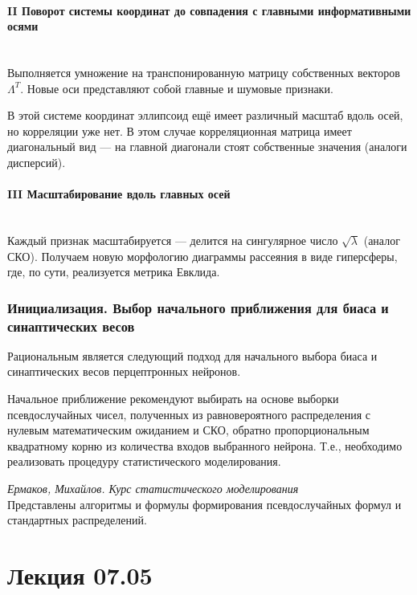 \documentclass{article}
\numberwithin{equation}{subsection}
\begin{document}
\paragraph{II Поворот системы координат до совпадения с 
главными информативными осями}\mbox{}\\
Выполняется умножение на транспонированную матрицу собственных векторов $\Lambda^T$.
Новые оси представляют собой главные и шумовые признаки.

В этой системе координат эллипсоид ещё имеет различный масштаб вдоль осей, но корреляции
уже нет.
В этом случае корреляционная матрица имеет диагональный вид --- на главной диагонали
стоят собственные значения (аналоги дисперсий).


\paragraph{III Масштабирование вдоль главных осей}\mbox{}\\
Каждый признак масштабируется --- делится на сингулярное число $\sqrt{\lambda}$
(аналог СКО).
Получаем новую морфологию диаграммы рассеяния в виде гиперсферы, где, по сути, реализуется
метрика Евклида.




\subsubsection{Инициализация. Выбор начального приближения для 
биаса и синаптических весов}

Рациональным является следующий подход для начального выбора биаса и синаптических
весов перцептронных нейронов.

Начальное приближение рекомендуют выбирать на основе выборки псевдослучайных чисел,
полученных из равновероятного распределения с нулевым математическим ожиданием 
и СКО, обратно пропорциональным квадратному корню из количества входов выбранного нейрона.
Т.е., необходимо реализовать процедуру статистического моделирования.

\begin{myquote}
    \textit{Ермаков, Михайлов. Курс статистического моделирования}\\
    Представлены алгоритмы и формулы формирования псевдослучайных формул
    и стандартных распределений.
\end{myquote}




\section{Лекция 07.05}
\end{document}
